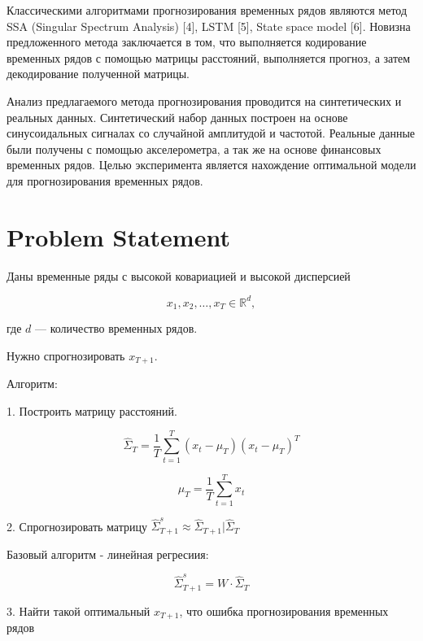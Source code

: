 \documentclass{article}
\begin{document}
Классическими алгоритмами прогнозирования временных рядов являются метод SSA (Singular Spectrum Analysis) [4], LSTM [5], State space model [6]. Новизна предложенного метода заключается в том, что выполняется кодирование временных рядов с помощью матрицы расстояний, выполняется прогноз, а затем декодирование полученной матрицы.

Анализ предлагаемого метода прогнозирования проводится на синтетических и реальных данных. Синтетический набор данных построен на основе синусоидальных сигналах со случайной амплитудой и частотой. Реальные данные были получены с помощью акселерометра, а так же на основе финансовых временных рядов. Целью эксперимента является нахождение оптимальной модели для прогнозирования временных рядов.

\section{Problem Statement}
\label{sec:headings}

Даны временные ряды с высокой ковариацией и высокой дисперсией


\begin{equation}
	x_1, x_2, \ldots, x_T \in \mathbb{R}^d,
\end{equation}

где $d$ — количество временных рядов.

Нужно спрогнозировать $x_{T+1}$.

Алгоритм:

1. Построить матрицу расстояний.

\begin{equation}
\hat{\Sigma}_T = \frac{1}{T} \sum_{t=1}^{T} (x_t - \mu_T)(x_t - \mu_T)^T
\end{equation}

\begin{equation}
\mu_T = \frac{1}{T} \sum_{t=1}^{T} x_t
\end{equation}

2. Спрогнозировать матрицу $\hat{\Sigma}_{T+1}^s \approx \hat{\Sigma}_{T+1} | \hat{\Sigma}_{T}$

Базовый алгоритм - линейная регресиия:

\begin{equation}
\hat{\Sigma}_{T+1}^s = W \cdot \hat{\Sigma}_{T}
\end{equation}


3. Найти такой оптимальный $x_{T+1}$, что ошибка прогнозирования временных рядов
\end{document}
